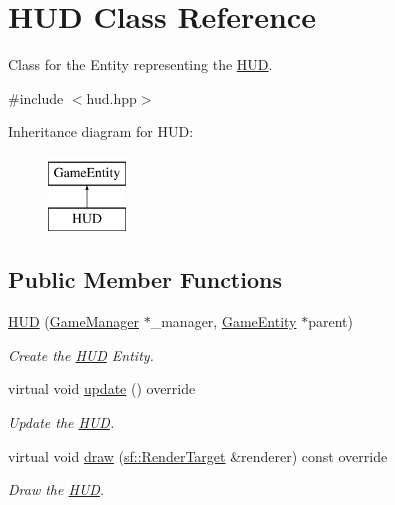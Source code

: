 \hypertarget{class_h_u_d}{}\section{H\+UD Class Reference}
\label{class_h_u_d}


Class for the Entity representing the \mbox{\hyperlink{class_h_u_d}{H\+UD}}.  




{\ttfamily \#include $<$hud.\+hpp$>$}

Inheritance diagram for H\+UD\+:\begin{figure}[H]
\begin{center}
\leavevmode
\includegraphics[height=2.000000cm]{class_h_u_d}
\end{center}
\end{figure}
\subsection*{Public Member Functions}
\begin{DoxyCompactItemize}
\item 
\mbox{\hyperlink{class_h_u_d_a8f9d329a1d1ea7aa3ef5d58265835468}{H\+UD}} (\mbox{\hyperlink{class_game_manager}{Game\+Manager}} $\ast$\+\_\+manager, \mbox{\hyperlink{class_game_entity}{Game\+Entity}} $\ast$parent)
\begin{DoxyCompactList}\small\item\em Create the \mbox{\hyperlink{class_h_u_d}{H\+UD}} Entity. \end{DoxyCompactList}\item 
\mbox{\label{class_h_u_d_a50604853faf2436e5f9d1228137ccf82}} 
virtual void \mbox{\hyperlink{class_h_u_d_a50604853faf2436e5f9d1228137ccf82}{update}} () override
\begin{DoxyCompactList}\small\item\em Update the \mbox{\hyperlink{class_h_u_d}{H\+UD}}. \end{DoxyCompactList}\item 
virtual void \mbox{\hyperlink{class_h_u_d_a9e27d1929b86f3cf30144aaf602e427d}{draw}} (\mbox{\hyperlink{classsf_1_1_render_target}{sf\+::\+Render\+Target}} \&renderer) const override
\begin{DoxyCompactList}\small\item\em Draw the \mbox{\hyperlink{class_h_u_d}{H\+UD}}. \end{DoxyCompactList}\end{DoxyCompactItemize}
